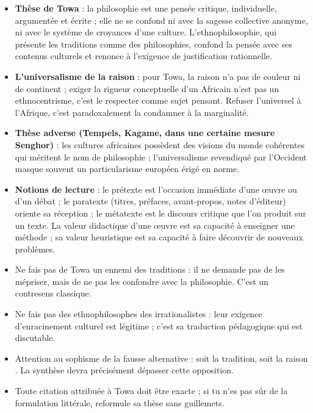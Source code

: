 \documentclass[11pt]{article}
\newcommand{\cle}[1]{{\popxbold\color{popdark}#1}}
\begin{document}
\begin{aretenir}
\begin{itemize}
\item \textbf{Thèse de Towa} : la philosophie est une pensée \cle{critique}, \cle{individuelle}, \cle{argumentée} et \cle{écrite} ; elle ne se confond ni avec la sagesse collective anonyme, ni avec le système de croyances d'une culture. L'ethnophilosophie, qui présente les traditions comme des philosophies, confond la pensée avec ses contenus culturels et renonce à l'exigence de justification rationnelle.
\item \textbf{L'universalisme de la raison} : pour Towa, la raison n'a pas de couleur ni de continent ; exiger la rigueur conceptuelle d'un Africain n'est pas un ethnocentrisme, c'est le respecter comme sujet pensant. Refuser l'universel à l'Afrique, c'est paradoxalement la condamner à la marginalité.
\item \textbf{Thèse adverse (Tempels, Kagame, dans une certaine mesure Senghor)} : les cultures africaines possèdent des visions du monde cohérentes qui méritent le nom de philosophie ; l'universalisme revendiqué par l'Occident masque souvent un particularisme européen érigé en norme.
\item \textbf{Notions de lecture} : le \cle{prétexte} est l'occasion immédiate d'une œuvre ou d'un débat ; le \cle{paratexte} (titres, préfaces, avant-propos, notes d'éditeur) oriente sa réception ; le \cle{métatexte} est le discours critique que l'on produit sur un texte. La \cle{valeur didactique} d'une œuvre est sa capacité à enseigner une méthode ; sa \cle{valeur heuristique} est sa capacité à faire découvrir de nouveaux problèmes.
\end{itemize}
\end{aretenir}

\begin{attention}
\begin{itemize}
\item Ne fais pas de Towa un \guillemotleft ennemi des traditions \guillemotright : il ne demande pas de les mépriser, mais de ne pas les confondre avec la philosophie. C'est un contresens classique.
\item Ne fais pas des ethnophilosophes des \guillemotleft irrationalistes \guillemotright : leur exigence d'enracinement culturel est légitime ; c'est sa traduction pédagogique qui est discutable.
\item Attention au sophisme de la fausse alternative : \guillemotleft soit la tradition, soit la raison \guillemotright. La synthèse devra précisément dépasser cette opposition.
\item Toute citation attribuée à Towa doit être exacte ; si tu n'es pas sûr de la formulation littérale, reformule sa thèse sans guillemets.
\end{itemize}
\end{attention}
\end{document}
